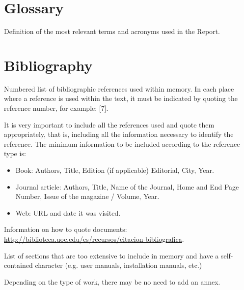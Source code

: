 \documentclass[ENG,BIB]{TFUOC}%
\begin{document}


\chapter{Glossary}

Definition of the most relevant terms and acronyms used in the Report.


\chapter{Bibliography}

Numbered list of bibliographic references used within memory. In each place where a reference is used within the text, it must be indicated by quoting the reference number, for example: [7].

It is very important to include all the references used and quote them appropriately, that is, including all the information necessary to identify the reference. The minimum information to be included according to the reference type is:

\begin{itemize}
\item Book: Authors, Title, Edition (if applicable) Editorial, City, Year.
\item  Journal article: Authors, Title, Name of the Journal, Home and End Page Number, Issue of the magazine / Volume, Year.
\item  Web: URL and date it was visited.
\end{itemize}

Information on how to quote documents: \url{http://biblioteca.uoc.edu/es/recursos/citacion-bibliografica}.


\newpage
\appendix
List of sections that are too extensive to include in memory and have a self-contained character (e.g. user manuals, installation manuals, etc.)
 
Depending on the type of work, there may be no need to add an annex.
\end{document}

